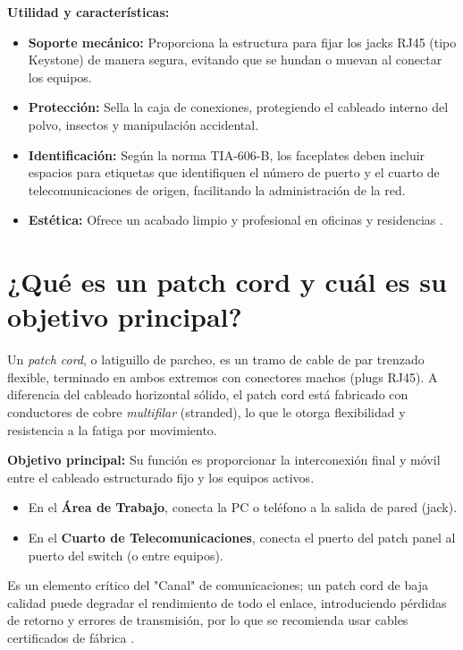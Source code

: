 \documentclass[a4paper,12pt]{article}
\begin{document}
\textbf{Utilidad y características:}
\begin{itemize}
    \item \textbf{Soporte mecánico:} Proporciona la estructura para fijar los jacks RJ45 (tipo Keystone) de manera segura, evitando que se hundan o muevan al conectar los equipos.
    \item \textbf{Protección:} Sella la caja de conexiones, protegiendo el cableado interno del polvo, insectos y manipulación accidental.
    \item \textbf{Identificación:} Según la norma TIA-606-B, los faceplates deben incluir espacios para etiquetas que identifiquen el número de puerto y el cuarto de telecomunicaciones de origen, facilitando la administración de la red.
    \item \textbf{Estética:} Ofrece un acabado limpio y profesional en oficinas y residencias \cite{sysracks}.
\end{itemize}

\section{¿Qué es un patch cord y cuál es su objetivo principal?}

Un \textit{patch cord}, o latiguillo de parcheo, es un tramo de cable de par trenzado flexible, terminado en ambos extremos con conectores machos (plugs RJ45). A diferencia del cableado horizontal sólido, el patch cord está fabricado con conductores de cobre \textit{multifilar} (stranded), lo que le otorga flexibilidad y resistencia a la fatiga por movimiento.

\textbf{Objetivo principal:}
Su función es proporcionar la interconexión final y móvil entre el cableado estructurado fijo y los equipos activos.
\begin{itemize}
    \item En el \textbf{Área de Trabajo}, conecta la PC o teléfono a la salida de pared (jack).
    \item En el \textbf{Cuarto de Telecomunicaciones}, conecta el puerto del patch panel al puerto del switch (o entre equipos).
\end{itemize}
Es un elemento crítico del "Canal" de comunicaciones; un patch cord de baja calidad puede degradar el rendimiento de todo el enlace, introduciendo pérdidas de retorno y errores de transmisión, por lo que se recomienda usar cables certificados de fábrica \cite{beststore, leviton}.

\newpage
\end{document}
